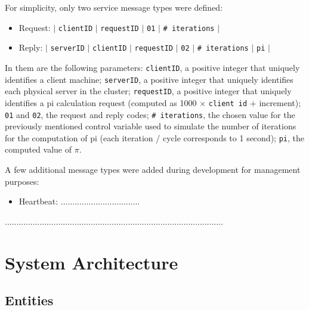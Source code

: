 \documentclass[12pt]{article}
\begin{document}
For simplicity, only two service message types were defined:
\vspace{-10pt}
\begin{itemize}[noitemsep]
  \item Request: $|$ \texttt{clientID} $|$ \texttt{requestID} $|$ \texttt{01} $|$ \texttt{\# iterations} $|$
  \item Reply: $|$ \texttt{serverID} $|$ \texttt{clientID} $|$ \texttt{requestID} $|$ \texttt{02} $|$ \texttt{\# iterations} $|$ \texttt{pi} $|$
\end{itemize}
\vspace{-10pt}
In them are the following parameters:
\texttt{clientID}, a positive integer that uniquely identifies a client machine;
\texttt{serverID}, a positive integer that uniquely identifies each physical server in the cluster;
\texttt{requestID}, a positive integer that uniquely identifies a pi calculation request (computed as 1000 $\times$ \texttt{client id} $+$ increment);
\texttt{01} and \texttt{02}, the request and reply codes;
\texttt{\# iterations}, the chosen value for the previously mentioned control variable used to simulate the number of iterations for the computation of pi
(each iteration / cycle corresponds to 1 second);
\texttt{pi}, the computed value of $\pi$.

A few additional message types were added during development for management purposes:
\vspace{-10pt}
\begin{itemize}[noitemsep]
  \item Heartbeat: ..................................
\end{itemize}
\vspace{-10pt}

..............................................................................................

\newpage
\section{System Architecture} \label{architecture} %


\subsection{Entities} \label{entities} %

\end{document}
